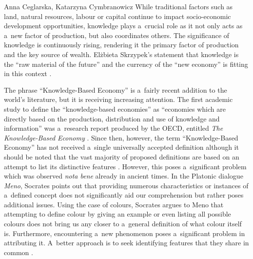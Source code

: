 \begin{artengenv2auth}{Anna Ceglarska, Katarzyna Cymbranowicz}
 While traditional factors such as land, natural resources, labour or capital continue to impact socio-economic development opportunities, knowledge plays a~crucial role as it not only acts as a~new factor of production, but also coordinates others. The significance of knowledge is continuously rising, rendering it the primary factor of production and the key source of wealth. Elżbieta Skrzypek's statement that knowledge is the ``raw material of the future'' and the currency of the ``new economy'' is fitting in this context 
\parencite[][p.20]{skrzypek_gow_2018}.%




The phrase ``Knowledge-Based Economy'' is a~fairly recent addition to the world's literature, but it is receiving increasing attention. The first academic study to define the ``knowledge-based economies'' as ``economies which are directly based on the production, distribution and use of knowledge and information'' was a~research report produced by the OECD, entitled \textit{The Knowledge-Based Economy} 
\parencite[][p.7]{oecd_knowledge-based_1996}. %
 Since then, however, the term ``Knowledge-Based Economy'' has not received a~single universally accepted definition although it should be noted that the vast majority of proposed definitions are based on an attempt to list its distinctive features
\parencite[][p.80]{kuklinski_wiedza_2001}. %
 However, this poses a~significant problem which was observed \textit{nota bene} already in ancient times. In the Platonic dialogue \textit{Meno}, Socrates points out that providing numerous characteristics or instances of a~defined concept does not significantly aid our comprehension but rather poses additional issues. Using the case of colours, Socrates argues to Meno that attempting to define colour by giving an example or even listing all possible colours does not bring us any closer to a~general definition of what colour itself is. Furthermore, encountering a~new phenomenon poses a~significant problem in attributing it. A~better approach is to seek identifying features that they share in common 
\parencite[][74c-77a]{plato_plato_1967}. %

\end{artengenv2auth}
